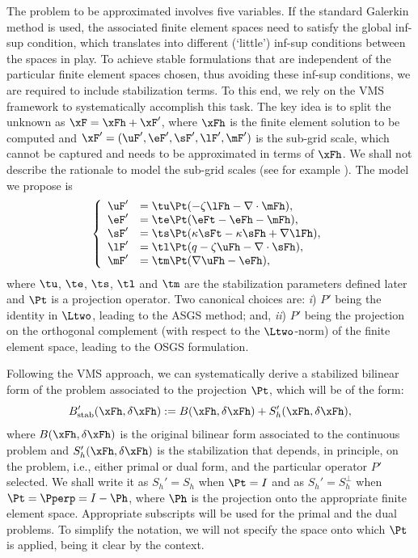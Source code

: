 The problem to be approximated involves five variables. If the standard Galerkin method is used, the associated finite element spaces need to satisfy the global inf-sup condition, which translates into different (`little') inf-sup conditions between the spaces in play. To achieve stable formulations that are independent of the particular finite element spaces chosen, thus avoiding these inf-sup conditions, we are required to include stabilization terms. To this end, we rely on the VMS framework to systematically accomplish this task. The key idea is to split the unknown as $\xF = \xFh+\xF'$, where $\xFh$ is the finite element solution to be computed and $\xF'= (\uF',\eF',\sF',\lF',\mF')$ is the sub-grid scale, which cannot be captured and needs to be approximated in terms of $\xFh$. We shall not describe the rationale to model the sub-grid scales (see for example \cite{Codina2017}). The model we propose is
\begin{equation}
\left\lbrace
\begin{array}{rl}
    \uF' &= \tu\Pt(-\zeta\lFh-\nabla\cdot\mFh),\\
    \eF' &= \te\Pt(\eFt-\eFh-\mFh),\\
    \sF' &= \ts\Pt(\kappa\sFt-\kappa\sFh+\nabla\lFh),\\
    \lF' &= \tl\Pt(q-\zeta\uFh-\nabla\cdot\sFh),\\
    \mF' &= \tm\Pt(\nabla\uFh-\eFh),
    \end{array}
\right.
\label{eq:subscales}
\end{equation}
where $\tu$, $\te$, $\ts$, $\tl$ and $\tm$ are the stabilization parameters defined later and $\Pt$ is a projection operator. Two canonical choices are: \textit{i}) $P'$ being the identity in $\Ltwo$, leading to the ASGS method; and, \textit{ii}) $P'$ being 
the projection on the orthogonal complement (with respect to the $\Ltwo$-norm) of the finite element space, leading to the OSGS formulation.

Following the VMS approach, we can systematically derive a stabilized bilinear form of the problem associated to the projection $\Pt$, which will be of the form:
$$
B'_\mathrm{stab}(\xFh, \delta \xFh) := 
B(\xFh, \delta \xFh) + S_h'(\xFh, \delta \xFh), 
$$
where $B(\xFh, \delta \xFh)$ is the original bilinear form associated to the continuous problem and $S_h'(\xFh, \delta \xFh)$  is the stabilization that depends, in principle, on the problem, i.e., either primal or dual form, and the particular operator $P'$ selected. We shall write it as $S_h' = S_h$ when $\Pt = I$ and as $S_h' = S_h^\bot$ when $\Pt = \Pperp = I - \Ph$, where $\Ph$ is the projection onto the appropriate finite element space. Appropriate subscripts will be used for the primal and the dual problems. To simplify the notation, we will not specify the space onto which $\Pt$ is applied, being it clear by the context.

